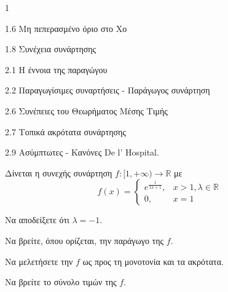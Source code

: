 \begin{ylh}{1}
    \item 1.6 Μη πεπερασμένο όριο στο Χο
    \item 1.8 Συνέχεια συνάρτησης
    \item 2.1 Η έννοια της παραγώγου
    \item 2.2 Παραγωγίσιμες συναρτήσεις - Παράγωγος συνάρτηση
    \item 2.6 Συνέπειες του Θεωρήματος Μέσης Τιμής
    \item 2.7 Τοπικά ακρότατα συνάρτησης
    \item 2.9 Ασύμπτωτες - Κανόνες De l’ Hospital.
\end{ylh}
Δίνεται η συνεχής συνάρτηση $f: [1, +\infty) \to \mathbb{R}$ με
\[ f(x) = \begin{cases} e^{\frac{1}{\lambda x+1}}, & x > 1, \lambda \in \mathbb{R} \\ 0, & x=1 \end{cases} \]
\begin{alist}
\item Να αποδείξετε ότι $\lambda = -1$. 
\item Να βρείτε, όπου ορίζεται, την παράγωγο της $f$. 
\item Να μελετήσετε την $f$ ως προς τη μονοτονία και τα ακρότατα. 
\item Να βρείτε το σύνολο τιμών της $f$. 
\end{alist}